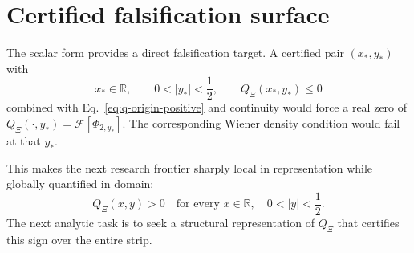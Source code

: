 \section{Certified falsification surface}

The scalar form provides a direct falsification target.  A certified pair $(x_*,y_*)$ with
\[
x_*\in\mathbb R,
\qquad
0<|y_*|<\frac12,
\qquad
Q_\Xi(x_*,y_*)\le0
\]
combined with Eq.~\eqref{eq:q-origin-positive} and continuity would force a real zero of $Q_\Xi(\cdot,y_*)=\mathcal F[\Phi_{2,y_*}]$.  The corresponding Wiener density condition would fail at that $y_*$.

This makes the next research frontier sharply local in representation while globally quantified in domain:
\begin{equation}\label{eq:xf4-frontier}
\boxed{
Q_\Xi(x,y)>0
\quad
\text{for every }x\in\mathbb R,
\quad0<|y|<\frac12.
}
\end{equation}
The next analytic task is to seek a structural representation of $Q_\Xi$ that certifies this sign over the entire strip.
